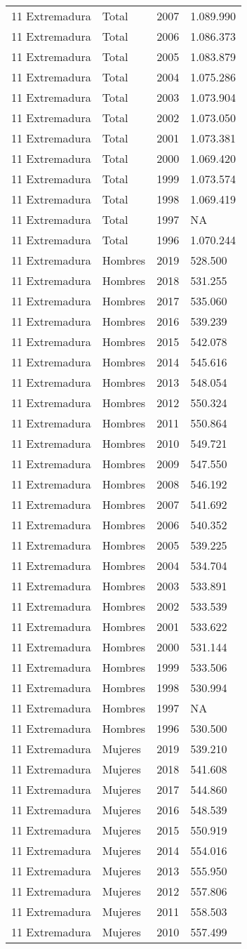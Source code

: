 \documentclass[
]{article}
\begin{document}
\begin{longtable}[]{@{}llrl@{}}
11 Extremadura & Total & 2007 & 1.089.990\tabularnewline
11 Extremadura & Total & 2006 & 1.086.373\tabularnewline
11 Extremadura & Total & 2005 & 1.083.879\tabularnewline
11 Extremadura & Total & 2004 & 1.075.286\tabularnewline
11 Extremadura & Total & 2003 & 1.073.904\tabularnewline
11 Extremadura & Total & 2002 & 1.073.050\tabularnewline
11 Extremadura & Total & 2001 & 1.073.381\tabularnewline
11 Extremadura & Total & 2000 & 1.069.420\tabularnewline
11 Extremadura & Total & 1999 & 1.073.574\tabularnewline
11 Extremadura & Total & 1998 & 1.069.419\tabularnewline
11 Extremadura & Total & 1997 & NA\tabularnewline
11 Extremadura & Total & 1996 & 1.070.244\tabularnewline
11 Extremadura & Hombres & 2019 & 528.500\tabularnewline
11 Extremadura & Hombres & 2018 & 531.255\tabularnewline
11 Extremadura & Hombres & 2017 & 535.060\tabularnewline
11 Extremadura & Hombres & 2016 & 539.239\tabularnewline
11 Extremadura & Hombres & 2015 & 542.078\tabularnewline
11 Extremadura & Hombres & 2014 & 545.616\tabularnewline
11 Extremadura & Hombres & 2013 & 548.054\tabularnewline
11 Extremadura & Hombres & 2012 & 550.324\tabularnewline
11 Extremadura & Hombres & 2011 & 550.864\tabularnewline
11 Extremadura & Hombres & 2010 & 549.721\tabularnewline
11 Extremadura & Hombres & 2009 & 547.550\tabularnewline
11 Extremadura & Hombres & 2008 & 546.192\tabularnewline
11 Extremadura & Hombres & 2007 & 541.692\tabularnewline
11 Extremadura & Hombres & 2006 & 540.352\tabularnewline
11 Extremadura & Hombres & 2005 & 539.225\tabularnewline
11 Extremadura & Hombres & 2004 & 534.704\tabularnewline
11 Extremadura & Hombres & 2003 & 533.891\tabularnewline
11 Extremadura & Hombres & 2002 & 533.539\tabularnewline
11 Extremadura & Hombres & 2001 & 533.622\tabularnewline
11 Extremadura & Hombres & 2000 & 531.144\tabularnewline
11 Extremadura & Hombres & 1999 & 533.506\tabularnewline
11 Extremadura & Hombres & 1998 & 530.994\tabularnewline
11 Extremadura & Hombres & 1997 & NA\tabularnewline
11 Extremadura & Hombres & 1996 & 530.500\tabularnewline
11 Extremadura & Mujeres & 2019 & 539.210\tabularnewline
11 Extremadura & Mujeres & 2018 & 541.608\tabularnewline
11 Extremadura & Mujeres & 2017 & 544.860\tabularnewline
11 Extremadura & Mujeres & 2016 & 548.539\tabularnewline
11 Extremadura & Mujeres & 2015 & 550.919\tabularnewline
11 Extremadura & Mujeres & 2014 & 554.016\tabularnewline
11 Extremadura & Mujeres & 2013 & 555.950\tabularnewline
11 Extremadura & Mujeres & 2012 & 557.806\tabularnewline
11 Extremadura & Mujeres & 2011 & 558.503\tabularnewline
11 Extremadura & Mujeres & 2010 & 557.499\tabularnewline

\end{longtable}
\end{document}
